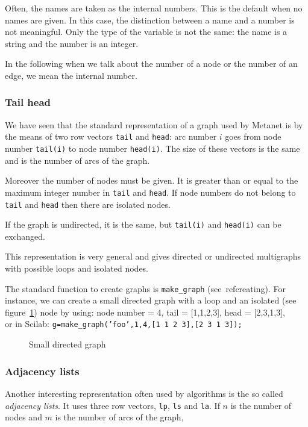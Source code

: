 \documentclass[11pt]{article}
\newcommand{\func}[1]{\texttt{#1}}
\begin{document}
Often, the names are taken as the internal numbers. This is
the default when no names are given. In this case, the distinction
between a name and a number is not meaningful. Only the type of the
variable is not the same: the name is a string and the number is an integer.

In the following when
we talk about the number of a node or the number of an edge, we mean
the internal number.

\subsubsection{Tail head}

We have seen that the standard representation of a graph used by
Metanet is by the means of two row vectors
\texttt{tail} and
\texttt{head}:
arc number $i$ goes from node
number \texttt{tail(i)} to node number \texttt{head(i)}.
The size of these vectors is the same and is the number of arcs of the
graph.

Moreover the number of nodes must be given. It is greater than or
equal to the maximum integer number in \texttt{tail} and
\texttt{head}. If node numbers do not belong to \texttt{tail} and
\texttt{head} then there are isolated nodes.

If the graph is undirected, it is the same, but \texttt{tail(i)} and
\texttt{head(i)} can be exchanged.

This representation is very general and gives directed or undirected
multigraphs with possible loops and isolated nodes.

The standard function to create graphs is \func{make\_graph}
(see~ref{creating}). 
For instance, we can create a small directed graph with a loop and an
isolated (see figure~\ref{fig-foo}) node by using:
node number = 4,
tail = [1,1,2,3],
head = [2,3,1,3],\\
or in Scilab:
\texttt{g=make\_graph('foo',1,4,[1 1 2 3],[2 3 1 3]);}

\begin{figure}
  \centerline{}
  \caption{Small directed graph}
  \label{fig-foo}
\end{figure}

\subsubsection{Adjacency lists}\label{adjacency}

Another interesting representation often used by algorithms is the so
called \emph{adjacency lists}. It uses three row vectors, \texttt{lp},
\texttt{ls} and \texttt{la}. If $n$ is the number of nodes and $m$ is the number
of arcs of the graph,
\end{document}
